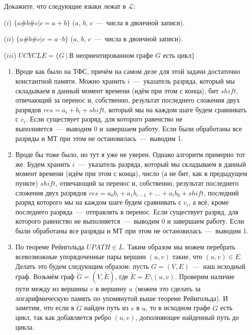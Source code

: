 \documentclass[a4paper,12pt]{article}
\begin{document}
\begin{tasknum}{4}
	Докажите, что следующие языки лежат в $\mathcal{L}$: 
	
	($i$) $\{a\#b\#c|c=a+b\}$ ($a$, $b$, $c$~---~числа в двоичной записи).
	
	($ii$) $\{a\#b\#c|c=a\cdot b\}$ ($a$, $b$, $c$~---~числа в двоичной записи).
	
	($iii$) $UCYCLE = \{G  \ | \ \mbox{В неориентированном графе $G$ есть цикл}\}$
\end{tasknum}

\begin{solution}
	\begin{enumerate}
		\item Вроде как было на ТФС, причём на самом деле для этой задачи достаточно константной памяти. Можно хранить $i$~---~указатель разряда, который мы складываем в данный момент времени (идём при этом с конца), бит $shift$, отвечающий за перенос и, собственно, результат последнего сложения двух разрядов $res = a_i + b_i + shift$, который мы на каждом шаге будем сравнивать с $c_i$. Если существует разряд, для которого равенство не выполняется~---~выводим 0 и завершаем работу. Если были обработаны все разряды и МТ при этом не остановилась~---~выводим 1.
		
		\item Вроде бы тоже было, но тут я уже не уверен. Однако алгоритм примерно тот же. Будем хранить $i$~---~указатель разряда, который мы складываем в данный момент времени (идём при этом с конца), число (а не бит, как в предыдущем пункте) $shift$, отвечающий за перенос и, собственно, результат последнего сложения двух разрядов $res = a_0 b_i + a_1 b_{i-1} + \ldots + a_i b_0 + shift$, последний разряд которого мы на каждом шаге будем сравнивать с $c_i$, а всё, кроме последнего разряда~---~отправлять в перенос. Если существует разряд, для которого равенство не выполняется~---~выводим 0 и завершаем работу. Если были обработаны все разряды и МТ при этом не остановилась~---~выводим 1.
		
		\item По теореме Рейнгольда $UPATH \in L$. Таким образом мы можем перебрать всевозможные упорядоченные пары вершин $(u, v)$ такие, что $(u, v) \in E$. Делать это будем следующим образом: пусть $G = (V, E)$~---~наш исходный граф. Возьмём граф $\tilde{G} = (V, \tilde{E})$, где $\tilde{E} = E \setminus (u, v)$. Проверим наличие пути между из вершины $v$ в вершину $u$ (можем это сделать за логарифмическую память по упомянутой выше теореме Рейнгольда). И заметим, что если в $\tilde{G}$ найден путь из $v$ в $u$, то в исходном графе $G$ есть цикл, так как добавляется ребро $(u, v)$, дополняющее найденный путь до цикла.
		
	\end{enumerate}
\end{solution}
\end{document}
